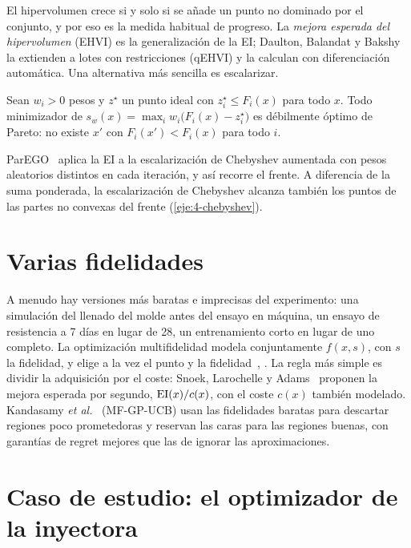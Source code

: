 El hipervolumen crece si y solo si se añade un punto no dominado por el conjunto, y por eso es la medida habitual de progreso. La \emph{mejora esperada del hipervolumen} (EHVI) es la generalización de la EI; Daulton, Balandat y Bakshy~\cite{qehvi} la extienden a lotes con restricciones (qEHVI) y la calculan con diferenciación automática. Una alternativa más sencilla es escalarizar.

\begin{proposicion}\label{prop:chebyshev}
Sean $w_i>0$ pesos y $z^\star$ un punto ideal con $z^\star_i\le F_i(x)$ para todo $x$. Todo minimizador de $s_w(x)=\max_i w_i\bigl(F_i(x)-z^\star_i\bigr)$ es débilmente óptimo de Pareto: no existe $x'$ con $F_i(x')<F_i(x)$ para todo $i$.
\end{proposicion}

ParEGO~\cite{parego} aplica la EI a la escalarización de Chebyshev aumentada con pesos aleatorios distintos en cada iteración, y así recorre el frente. A diferencia de la suma ponderada, la escalarización de Chebyshev alcanza también los puntos de las partes no convexas del frente (\cref{eje:4-chebyshev}).

\section{Varias fidelidades}

A menudo hay versiones más baratas e imprecisas del experimento: una simulación del llenado del molde antes del ensayo en máquina, un ensayo de resistencia a 7 días en lugar de 28, un entrenamiento corto en lugar de uno completo. La optimización multifidelidad modela conjuntamente $f(x,s)$, con $s$ la fidelidad, y elige a la vez el punto y la fidelidad~\cite[§11.5]{garnett}, \cite[§5]{frazier}. La regla más simple es dividir la adquisición por el coste: Snoek, Larochelle y Adams~\cite{snoek} proponen la mejora esperada por segundo, $\operatorname{EI}(x)/c(x)$, con el coste $c(x)$ también modelado. Kandasamy \emph{et al.}~\cite{kandasamy} (MF-GP-UCB) usan las fidelidades baratas para descartar regiones poco prometedoras y reservan las caras para las regiones buenas, con garantías de regret mejores que las de ignorar las aproximaciones.

\section{Caso de estudio: el optimizador de la inyectora}

\addtocounter{definicion}{1}%

